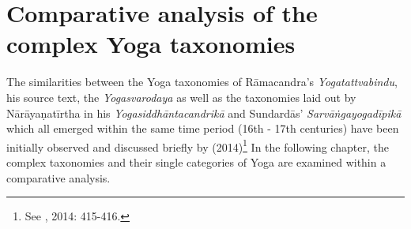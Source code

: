

\section{Comparative analysis of the complex Yoga taxonomies}

The similarities between the Yoga taxonomies of Rāmacandra's \textit{Yogatattvabindu}, his source text, the \textit{Yogasvarodaya} as well as the taxonomies laid out by Nārāyaṇatīrtha in his \textit{Yogasiddhāntacandrikā} and Sundardās' \textit{Sarvāṅgayogadīpikā} which all emerged within the same time period (16th - 17th centuries) have been initially observed and discussed briefly by \citeauthor{birch2014} (2014)\footnote{See \citeauthor{birch2014}, 2014: 415-416.} In the following chapter, the complex taxonomies and their single categories of Yoga are examined within a comparative analysis.

